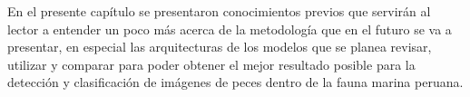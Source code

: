 En el presente capítulo se presentaron conocimientos previos que servirán al lector a entender un poco más acerca de la metodología que en el futuro se va a presentar, en especial las arquitecturas de los modelos que se planea revisar, utilizar y comparar para poder obtener el mejor resultado posible para la detección y clasificación de imágenes de peces dentro de la fauna marina peruana. 


